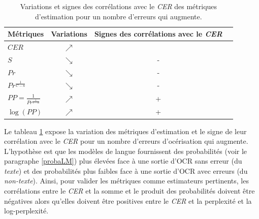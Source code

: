 \documentclass[10pt,twoside]{article}
\begin{document}
        \begin{table}[h]
        \begin{center}
        \begin{tabular}{|l|c|c|c|}
        \hline
        \textbf{Métriques}  & \textbf{Variations} & \textbf{Signes des corrélations avec le \textit{CER}}    \\\hline
        $CER$  & $\nearrow$      &     \\ 
        $S$    & $\searrow$     & -   \\ 
        $Pr$    & $\searrow$     & -   \\
        $Pr^\frac{1}{C-n}$   & $\searrow$    & -    \\
        $PP=\frac{1}{Pr ^{\frac{1}{C-n}}}$ & $\nearrow$   & +   \\ 
        $\log \left (   PP   \right )$  & $\nearrow$      & + \\ 
        \hline
        \end{tabular}
        \caption{Variations et signes des corrélations avec le \textit{CER} des métriques d'estimation pour un nombre d'erreurs qui augmente.} \label{tab:var_cor}
        \end{center}
        \end{table}

    Le tableau \ref{tab:var_cor} expose la variation des métriques d'estimation et le signe de leur 
    corrélation avec le \textit{CER} pour un nombre d'erreurs d'océrisation qui augmente. L'hypothèse est que les
    modèles de langue fournissent des probabilités (voir le paragraphe \ref{probaLM})
    plus élevées face à une sortie d'OCR sans erreur (du \textit{texte}) et des
    probabilités plus faibles face à une sortie d'OCR avec erreurs (du \textit{non-texte}). Ainsi, pour valider les métriques comme estimateurs pertinents, les corrélations entre le \textit{CER} et la somme et le produit des 
    probabilités doivent être négatives alors qu'elles doivent être positives entre le \textit{CER}
    et la perplexité et la log-perplexité.
    
\end{document}
